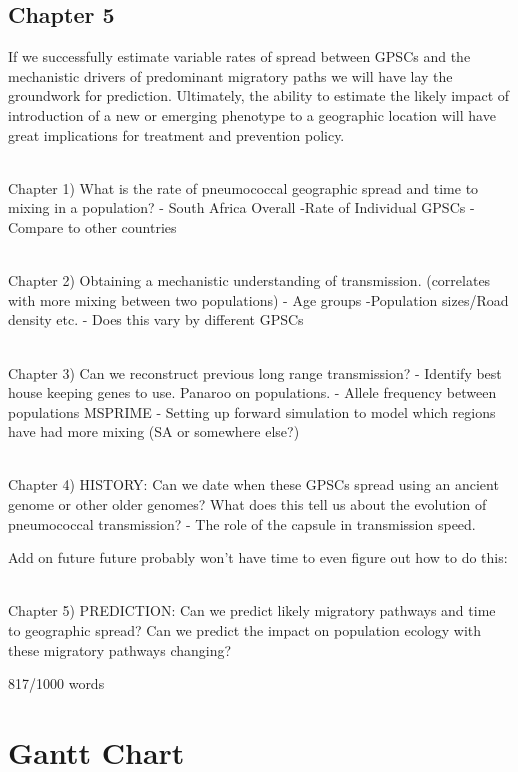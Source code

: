\documentclass{article}
\begin{document}
\subsection{Chapter 5}
If we successfully estimate variable rates of spread between GPSCs and the mechanistic drivers of predominant migratory paths we will have lay the groundwork for prediction. Ultimately, the ability to estimate the likely impact of introduction of a new or emerging phenotype to a geographic location will have great implications for treatment and prevention policy. 





\\Chapter 1) What is the rate of pneumococcal geographic spread and time to mixing in a population? 
	- South Africa Overall
    -Rate of Individual GPSCs
    -Compare to other countries
    
\\Chapter 2) Obtaining a mechanistic understanding of transmission. (correlates with more mixing between two populations)
- Age groups
-Population sizes/Road density etc.
- Does this vary by different GPSCs

\\Chapter 3)  Can we reconstruct previous long range transmission? 
- Identify best house keeping genes to use. Panaroo on populations.
- Allele frequency between populations MSPRIME
- Setting up forward simulation to model which regions have had more mixing (SA or somewhere else?)

\\Chapter 4) HISTORY: Can we date when these GPSCs spread using an ancient genome or other older genomes? What does this tell us about the evolution of pneumococcal transmission? 
- The role of the capsule in transmission speed. 

Add on future future probably won't have time to even figure out how to do this:

\\Chapter 5) PREDICTION: Can we predict likely migratory pathways and time to geographic spread? Can we predict the impact on population ecology with these migratory pathways changing? 


817/1000 words
\section{Gantt Chart}
\printbibliography
\end{document}
